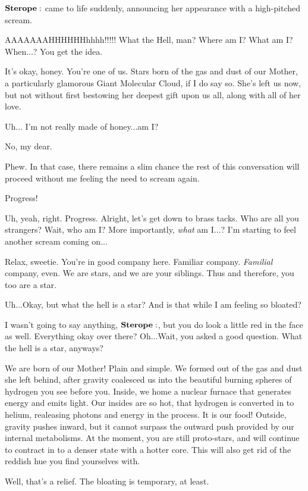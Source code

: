 \documentclass[main.tex]{subfiles}
\begin{document}
$\Sterope$ came to life suddenly, announcing her appearance with a high-pitched scream.

\Sterope AAAAAAAHHHHHHhhhh!!!!!  What the Hell, man?  Where am I?  What am I?  When...?  You get the idea.

\Maia It's okay, honey.  You're one of us.  Stars born of the gas and dust of our Mother, a particularly glamorous Giant Molecular Cloud, if I do say so.  She's left us now, but not without first bestowing her deepest gift upon us all, along with all of her love.

\Sterope  Uh... I'm not really made of honey...am I?  

\Maia No, my dear.

\Sterope  Phew.  In that case, there remains a slim chance the rest of this conversation will proceed without me feeling the need to scream again.

\Maia Progress!

\Sterope Uh, yeah, right.  Progress.  Alright, let's get down to brass tacks.  Who are all you strangers?  Wait, who am I?  More importantly, \textit{what} am I...?  I'm starting to feel another scream coming on...

\Maia Relax, sweetie.  You're in good company here.  Familiar company.  \textit{Familial} company, even. We are stars, and we are your siblings.  Thus and therefore, you too are a star.  

\Sterope Uh...Okay, but what the hell is a star?  And is that while I am feeling so bloated?

\Alcyone I wasn't going to say anything, $\Sterope$, but you do look a little red in the face as well.  Everything okay over there?  Oh...Wait, you asked a good question.  What the hell is a star, anyways?

\Maia We are born of our Mother!  Plain and simple.  We formed out of the gas and dust she left behind, after gravity coalesced us into the beautiful burning spheres of hydrogen you see before you.  Inside, we home a nuclear furnace that generates energy and emits light.  Our insides are so hot, that hydrogen is converted in to helium, realeasing photons and energy in the process.  It is our food!  Outside, gravity pushes inward, but it cannot surpass the outward push provided by our internal metabolisms.  At the moment, you are still proto-stars, and will continue to contract in to a denser state with a hotter core.  This will also get rid of the reddish hue you find yourselves with.

\Sterope Well, that's a relief.  The bloating is temporary, at least.
\end{document}
